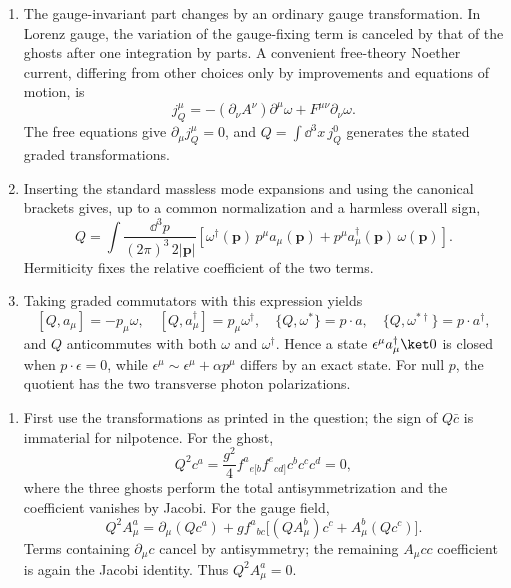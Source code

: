 \begin{enumerate}
  \begin{enumerate}
    \item[(a)] The gauge-invariant part changes by an ordinary gauge
      transformation.  In Lorenz gauge, the variation of the gauge-fixing
      term is canceled by that of the ghosts after one integration by
      parts.  A convenient free-theory Noether current, differing from
      other choices only by improvements and equations of motion, is
      \[
        j_Q^\mu=-(\partial_\nu A^\nu)\partial^\mu\omega
          +F^{\mu\nu}\partial_\nu\omega .
      \]
      The free equations give \(\partial_\mu j_Q^\mu=0\), and
      \(Q=\int \dd^3x\,j_Q^0\) generates the stated graded transformations.
    \item[(b)] Inserting the standard massless mode expansions and using
      the canonical brackets gives, up to a common normalization and a
      harmless overall sign,
      \[
        Q=\int\frac{\dd^3p}{(2\pi)^3\,2|\mathbf p|}
        \left[
          \omega^\dagger(\mathbf p)\,p^\mu a_\mu(\mathbf p)
          +p^\mu a_\mu^\dagger(\mathbf p)\,\omega(\mathbf p)
        \right].
      \]
      Hermiticity fixes the relative coefficient of the two terms.
    \item[(c)] Taking graded commutators with this expression yields
      \[
        [Q,a_\mu]=-p_\mu\omega,\quad
        [Q,a_\mu^\dagger]=p_\mu\omega^\dagger,\quad
        \{Q,\omega^*\}=p\cdot a,\quad
        \{Q,\omega^{*\dagger}\}=p\cdot a^\dagger,
      \]
      and \(Q\) anticommutes with both \(\omega\) and
      \(\omega^\dagger\).  Hence a state
      \(\epsilon^\mu a_\mu^\dagger\ket0\) is closed when
      \(p\cdot\epsilon=0\), while \(\epsilon^\mu\sim
      \epsilon^\mu+\alpha p^\mu\) differs by an exact state.  For null
      \(p\), the quotient has the two transverse photon polarizations.
  \end{enumerate}

  \begin{enumerate}
    \item[(a)] First use the transformations as printed in the question;
      the sign of \(Q\bar c\) is immaterial for nilpotence.  For the ghost,
      \[
        Q^2c^a=\frac{g^2}{4}f^a{}_{e[b}f^e{}_{cd]}
          c^bc^cc^d=0,
      \]
      where the three ghosts perform the total antisymmetrization and the
      coefficient vanishes by Jacobi.  For the gauge field,
      \[
        Q^2A_\mu^a
          =\partial_\mu(Qc^a)+gf^a{}_{bc}
            \bigl[(QA_\mu^b)c^c+A_\mu^b(Qc^c)\bigr].
      \]
      Terms containing \(\partial_\mu c\) cancel by antisymmetry; the
      remaining \(A_\mu c c\) coefficient is again the Jacobi identity.
      Thus \(Q^2A_\mu^a=0\).


\end{enumerate}
\end{enumerate}
